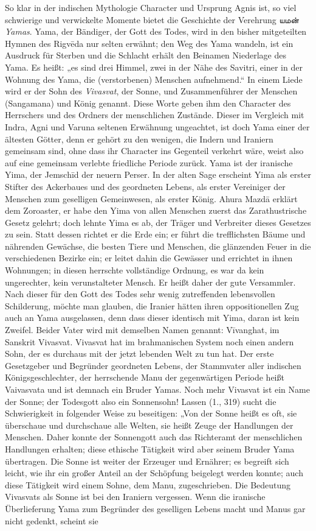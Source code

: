 \documentclass{article}
\newcommand{\TamilText}[1]{\texttamil{#1}}
\newcommand{\tam}[1]{\TamilText{#1}}
\begin{document}
So klar in der indischen Mythologie Character und Ursprung Agnis ist, so viel schwierige und verwickelte Momente bietet die Geschichte der Verehrung \tam{யமன்} \emph{Yamas}. Yama, der Bändiger, der Gott des Todes, wird in den bisher mitgeteilten Hymnen des Rigv\={e}da nur selten erwähnt; den Weg des Yama wandeln, ist ein Ausdruck für Sterben und die Schlacht erhält den Beinamen Niederlage des Yama. Es heißt: „es sind drei Himmel, zwei in der Nähe des Savitri, einer in der Wohnung des Yama, die (verstorbenen) Menschen aufnehmend.“ In einem Liede wird er der Sohn des \emph{Vivasvat}, der Sonne, und Zusammenführer der Menschen (Sangamana) und König genannt. Diese Worte geben ihm den Character des Herrschers und des Ordners der menschlichen Zustände. Dieser im Vergleich mit Indra, Agni und Varuna seltenen Erwähnung ungeachtet, ist doch Yama einer der ältesten Götter, denn er gehört zu den wenigen, die Indern und Iraniern gemeinsam sind, ohne dass ihr Character ins Gegenteil verkehrt wäre, weist also auf eine gemeinsam verlebte friedliche Periode zurück. Yama ist der iranische Yima, der Jemsch\={i}d der neuern Perser. In der alten Sage erscheint Yima als erster Stifter des Ackerbaues und des geordneten Lebens, als erster Vereiniger der Menschen zum geselligen Gemeinwesen, als erster König. Ahura Mazd\={a} erklärt dem Zoroaster, er habe den Yima von allen Menschen zuerst das Zarathustrische Gesetz gelehrt; doch lehnte Yima es ab, der Träger und Verbreiter dieses Gesetzes zu sein. Statt dessen richtet er die Erde ein; er führt die trefflichsten Bäume und nährenden Gewächse, die besten Tiere und Menschen, die glänzenden Feuer in die verschiedenen Bezirke ein; er leitet dahin die Gewässer und errichtet in ihnen Wohnungen; in diesen herrschte vollständige Ordnung, es war da kein ungerechter, kein verunstalteter Mensch. Er heißt daher der gute Versammler. Nach dieser für den Gott des Todes sehr wenig zutreffenden lebensvollen Schilderung, möchte man glauben, die Iranier hätten ihren oppositionellen Zug auch an Yama ausgelassen, denn dass dieser identisch mit Yima, daran ist kein Zweifel. Beider Vater wird mit demselben Namen genannt: V\={i}vanghat, im Sanskrit Vivasvat. Vivasvat hat im brahmanischen System noch einen andern Sohn, der es durchaus mit der jetzt lebenden Welt zu tun hat. Der erste Gesetzgeber und Begründer geordneten Lebens, der Stammvater aller indischen Königsgeschlechter, der herrschende Manu der gegenwärtigen Periode heißt Vaivasvata und ist demnach ein Bruder Yamas. Noch mehr Vivasvat ist ein Name der Sonne; der Todesgott also ein Sonnensohn! Lassen (1., 319) sucht die Schwierigkeit in folgender Weise zu beseitigen: „Von der Sonne heißt es oft, sie überschaue und durchschaue alle Welten, sie heißt Zeuge der Handlungen der Menschen. Daher konnte der Sonnengott auch das Richteramt der menschlichen Handlungen erhalten; diese ethische Tätigkeit wird aber seinem Bruder Yama übertragen. Die Sonne ist weiter der Erzeuger und Ernährer; es begreift sich leicht, wie ihr ein großer Anteil an der Schöpfung beigelegt werden konnte; auch diese Tätigkeit wird einem Sohne, dem Manu, zugeschrieben. Die Bedeutung Vivasvats als Sonne ist bei den Iraniern vergessen. Wenn die iranische Überlieferung Yama zum Begründer des geselligen Lebens macht und Manus gar nicht gedenkt, scheint sie 
\end{document}
